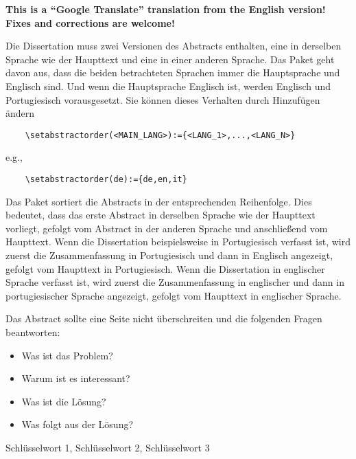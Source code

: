 
%

\textbf{This is a “Google Translate” translation from the English version!  Fixes and corrections are welcome!}

Die Dissertation muss zwei Versionen des Abstracts enthalten, eine in derselben Sprache wie der Haupttext und eine in einer anderen Sprache. Das Paket geht davon aus, dass die beiden betrachteten Sprachen immer die Hauptsprache und Englisch sind. Und wenn die Hauptsprache Englisch ist, werden Englisch und Portugiesisch vorausgesetzt. Sie können dieses Verhalten durch Hinzufügen ändern
\begin{verbatim}
    \setabstractorder(<MAIN_LANG>):={<LANG_1>,...,<LANG_N>}
\end{verbatim}
\noindent e.g.,
\begin{verbatim}
    \setabstractorder(de):={de,en,it}
\end{verbatim}

Das Paket sortiert die Abstracts in der entsprechenden Reihenfolge. Dies bedeutet, dass das erste Abstract in derselben Sprache wie der Haupttext vorliegt, gefolgt vom Abstract in der anderen Sprache und anschließend vom Haupttext. Wenn die Dissertation beispielsweise in Portugiesisch verfasst ist, wird zuerst die Zusammenfassung in Portugiesisch und dann in Englisch angezeigt, gefolgt vom Haupttext in Portugiesisch. Wenn die Dissertation in englischer Sprache verfasst ist, wird zuerst die Zusammenfassung in englischer und dann in portugiesischer Sprache angezeigt, gefolgt vom Haupttext in englischer Sprache.

Das Abstract sollte eine Seite nicht überschreiten und die folgenden Fragen beantworten:

\begin{itemize}
  \item Was ist das Problem?
  \item Warum ist es interessant?
  \item Was ist die Lösung?
  \item Was folgt aus der Lösung?
\end{itemize}

\begin{keywords}
Schlüsselwort 1, Schlüsselwort 2, Schlüsselwort 3
\end{keywords}
